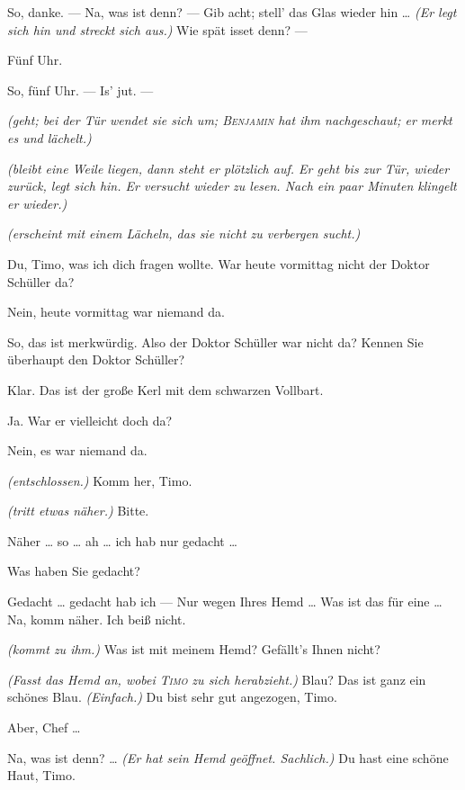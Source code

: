 \documentclass[
	final,
	a4paper,
	ngerman,
	mpinclude = true, %
	twoside = true,
	open = right,
	cleardoublepage = plain,
	DIV = 13,
	BCOR = 1cm,
	titlepage = firstiscover,
	]{scrbook}
\newcommand{\direction}[1]{\textit{(#1)}}
\newcommand{\thecharacter}[1]{\textup{\textsc{#1}}\xspace}
\newcommand{\thepraktikant}{\thecharacter{Timo}}
\newcommand{\theherr}{\thecharacter{Benjamin}}
\newcommand{\character}[1]{\item[#1:]}
\newcommand{\praktikant}{\character{\thepraktikant}}
\newcommand{\herr}{\character{\theherr}}
\begin{document}
\begin{play}
	\herr
	So, danke. --- Na, was ist denn? --- Gib acht; stell' das Glas wieder hin \ldots{} \direction{Er legt sich hin und streckt sich aus.} Wie spät isset denn? ---

	\praktikant
	Fünf Uhr.

	\herr
	So, fünf Uhr. --- Is' jut. ---

	\praktikant
	\direction{geht; bei der Tür wendet sie sich um; \theherr hat ihm nachgeschaut; er merkt es und lächelt.}

	\herr
	\direction{bleibt eine Weile liegen, dann steht er plötzlich auf. Er geht bis zur Tür, wieder zurück, legt sich hin. Er versucht wieder zu lesen. Nach ein paar Minuten klingelt er wieder.}

	\praktikant
	\direction{erscheint mit einem Lächeln, das sie nicht zu verbergen sucht.}

	\herr
	Du, Timo, was ich dich fragen wollte. War heute vormittag nicht der Doktor Schüller da?

	\praktikant
	Nein, heute vormittag war niemand da.

	\herr
	So, das ist merkwürdig. Also der Doktor Schüller war nicht da? Kennen Sie überhaupt den Doktor Schüller?

	\praktikant
	Klar. Das ist der große Kerl mit dem schwarzen Vollbart.

	\herr
	Ja. War er vielleicht doch da?

	\praktikant
	Nein, es war niemand da.

	\herr
	\direction{entschlossen.} Komm her, Timo.

	\praktikant
	\direction{tritt etwas näher.} Bitte.

	\herr
	Näher \ldots{} so \ldots{} ah \ldots{} ich hab nur gedacht \ldots{}

	\praktikant
	Was haben Sie gedacht?

	\herr
	Gedacht \ldots{} gedacht hab ich --- Nur wegen Ihres Hemd \ldots{} Was ist das für eine \ldots{} Na, komm näher. Ich beiß nicht.

	\praktikant
	\direction{kommt zu ihm.} Was ist mit meinem Hemd? Gefällt's Ihnen nicht?

	\herr
	\direction{Fasst das Hemd an, wobei \thepraktikant zu sich herabzieht.} Blau? Das ist ganz ein schönes Blau. \direction{Einfach.} Du bist sehr gut angezogen, Timo.

	\praktikant
	Aber, Chef \ldots{}

	\herr
	Na, was ist denn? \ldots{} \direction{Er hat sein Hemd geöffnet. Sachlich.} Du hast eine schöne Haut, Timo.


\end{play}
\end{document}
